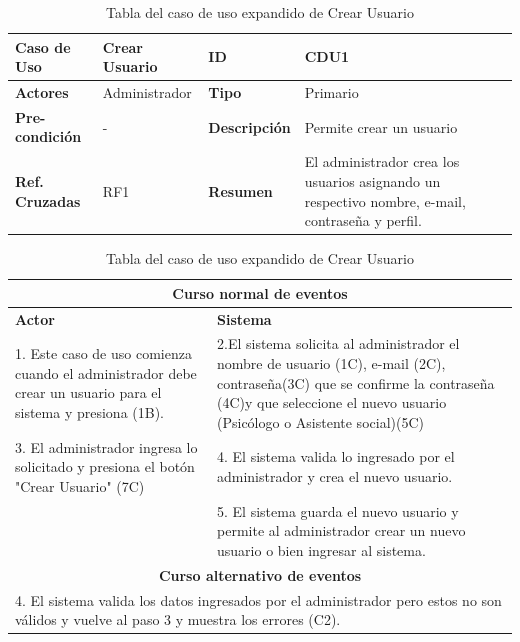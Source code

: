 \begin{table}
	\centering
	\begin{tabular}{|p{3cm}|p{3cm}|p{2.3cm} |p{3cm}|}
		\hline \textbf{Caso de Uso} & Crear Usuario & \textbf{ID} & CDU1 \\ 
		\hline \textbf{Actores} & Administrador & \textbf{Tipo} & Primario \\ 
		\hline \textbf{Pre-condición} & - & \textbf{Descripción} & Permite crear un usuario\\
		\hline \textbf{Ref. Cruzadas} & RF1 & \textbf{Resumen} & El administrador crea los usuarios asignando un respectivo nombre, e-mail, contraseña y perfil.\\ 
		\hline
	\end{tabular}  
	
	\begin{tabular}{|p{6cm}|p{6cm}|}
		
		\multicolumn{2}{|c|}{\textbf{Curso normal de eventos}} \\
		\hline \textbf{Actor} & \textbf{Sistema} \\ 
		\hline 1. Este caso de uso comienza cuando el administrador debe crear un usuario para el sistema y presiona (1B). & 2.El sistema solicita al administrador el nombre de usuario (1C), e-mail (2C), contraseña(3C) que se confirme la contraseña (4C)y que seleccione el nuevo usuario (Psicólogo o Asistente social)(5C)  \\ 
		3. El administrador ingresa lo solicitado y presiona el botón "Crear Usuario" (7C) & 4. El sistema valida lo ingresado por el administrador y crea el nuevo usuario. \\
		& 5. El sistema guarda el nuevo usuario y permite al administrador crear un nuevo usuario o bien ingresar al sistema. \\
		\hline
		\multicolumn{2}{|c|}{\textbf{Curso alternativo de eventos}} \\
		\hline
		\multicolumn{2}{|p{12cm}|}{4. El sistema valida los datos ingresados por el administrador pero estos no son válidos y vuelve al paso 3 y muestra los errores (C2).} \\
		\hline
	\end{tabular}
	\caption{Tabla del caso de uso expandido de Crear Usuario}
	\label{tabcdu1.1}
\end{table}

\clearpage


